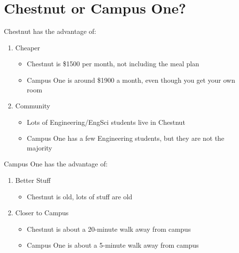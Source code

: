 \section{Chestnut or Campus One?}

Chestnut has the advantage of: 

\begin{enumerate}
    \item Cheaper
    \begin{itemize}
        \item Chestnut is \$1500 per month, not including the meal plan
        \item Campus One is around \$1900 a month, even though you get your own room
    \end{itemize}
    \item Community
    \begin{itemize}
        \item Lots of Engineering/EngSci students live in Chestnut
        \item Campus One has a few Engineering students, but they are not the majority
    \end{itemize}
\end{enumerate}

Campus One has the advantage of: 
\begin{enumerate}
    \item Better Stuff
    \begin{itemize}
        \item Chestnut is old, lots of stuff are old
    \end{itemize}
    \item Closer to Campus
    \begin{itemize}
        \item Chestnut is about a 20-minute walk away from campus
        \item Campus One is about a 5-minute walk away from campus
    \end{itemize}
\end{enumerate}
